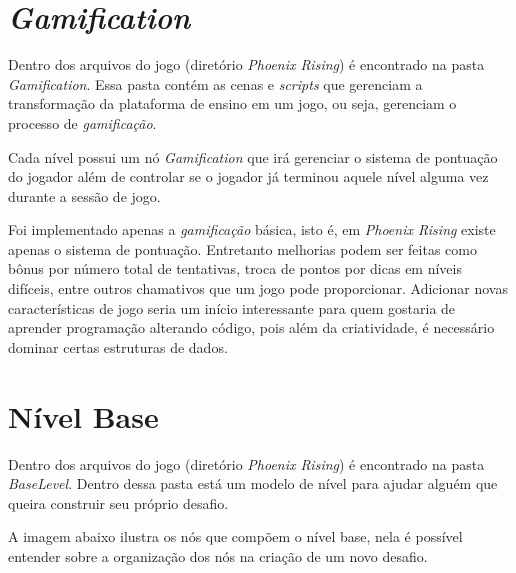 \section{\textit{Gamification}}

Dentro dos arquivos do jogo (diretório \textit{Phoenix Rising}) é encontrado na
pasta \textit{Gamification}. Essa pasta contém as cenas e \textit{scripts} que 
gerenciam a transformação da plataforma de ensino em um jogo, ou seja, gerenciam
o processo de \textit{gamificação}.

Cada nível possui um nó \textit{Gamification} que irá gerenciar o sistema de 
pontuação do jogador além de controlar se o jogador já terminou aquele nível
alguma vez durante a sessão de jogo. 

Foi implementado apenas a \textit{gamificação} básica, isto é, em 
\textit{Phoenix Rising} existe apenas o sistema de pontuação. Entretanto 
melhorias podem ser feitas como bônus por número total de tentativas, troca 
de pontos por dicas em níveis difíceis, entre outros chamativos que um jogo 
pode proporcionar. Adicionar novas características de jogo seria um início
interessante para quem gostaria de aprender programação alterando código, pois
além da criatividade, é necessário dominar certas estruturas de dados.

\section{Nível Base}

Dentro dos arquivos do jogo (diretório \textit{Phoenix Rising}) é encontrado na
pasta \textit{BaseLevel}. Dentro dessa pasta está um modelo de nível para ajudar 
alguém que queira construir seu próprio desafio.

A imagem abaixo ilustra os nós que compõem o nível base, nela é 
possível entender sobre a organização dos nós na criação de um novo desafio. 

